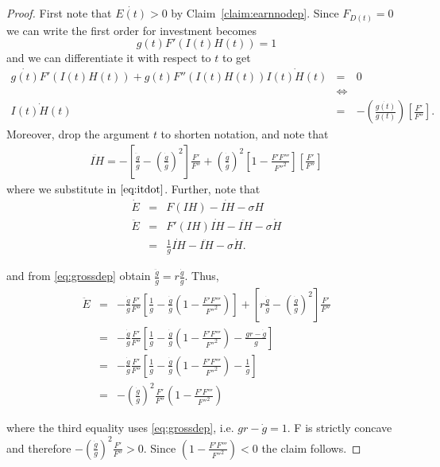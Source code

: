 \begin{proof}
First note that $\dot{E(t)} > 0$ by Claim~\ref{claim:earnnodep}. Since $F_{D(t)} = 0 $ we can write the first order for investment becomes
\begin{equation}
g(t) F'(I(t) H(t)) = 1
\end{equation}
and we can differentiate it with respect to $t$ to get
\begin{eqnarray}
\dot{g(t)} F'(I(t) H(t)) + g(t) F''(I(t) H(t)) \dot{I(t) H(t)} &=& 0 \nonumber \\
&\Leftrightarrow& \nonumber \\
\dot{I(t) H(t)} &=& - \left( \frac{\dot{g(t)}}{g(t)} \right) \left[ \frac{F'}{F''}\right] \label{eq:itdot}.
\end{eqnarray}
\noindent Moreover, drop the argument $t$ to shorten notation, and note that
\begin{eqnarray}
\ddot{IH} = - \left[ \frac{\ddot{g}}{g} - \left( \frac{\dot{g}}{g} \right)^2 \right] \frac{F'}{F''} + \left( \frac{\dot{g}}{g} \right)^2 \left[ 1 - \frac{F'F'''}{{F''}^2} \right] \left[ \frac{F'}{F''} \right]  
\end{eqnarray}  
where we substitute in $\eqref{eq:itdot}$. Further, note that
\begin{eqnarray}
\dot{E} &=& F(IH) - \dot{IH} - \sigma H \nonumber \\
\ddot{E} &=& F'(IH) \dot{IH} - \ddot{IH} - \sigma \dot{H} \nonumber \\
&=& \frac{1}{g} \dot{IH} - \ddot{IH} - \sigma \dot{H}.
\end{eqnarray}

\noindent and from \eqref{eq:grossdep} obtain $\frac{\ddot{g}}{g} = r \frac{\dot{g}}{g}$. Thus,
\begin{eqnarray}
\ddot{E} &=& - \frac{\dot{g}}{g} \frac{F'}{F''} \left[ \frac{1}{g} - \frac{\dot{g}}{g} \left( 1 - \frac{F'F'''}{{F''}^2} \right) \right] + \left[ r \frac{\dot{g}}{g} - \left( \frac{\dot{g}}{g} \right)^2 \right] \frac{F'}{F''} \nonumber \\
&=& - \frac{\dot{g}}{g} \frac{F'}{F''} \left[ \frac{1}{g} - \frac{\dot{g}}{g} \left( 1 - \frac{F'F'''}{{F''}^2} \right) - \frac{gr - \dot{g}}{g} \right] \nonumber \\
&=& - \frac{\dot{g}}{g} \frac{F'}{F''} \left[ \frac{1}{g} - \frac{\dot{g}}{g} \left( 1 - \frac{F'F'''}{{F''}^2} \right) - \frac{1}{g} \right] \nonumber \\
&=& - \left( \frac{\dot{g}}{g} \right)^2 \frac{F'}{F''} \left( 1 - \frac{F'F'''}{{F''}^2} \right)
\end{eqnarray}

\noindent where the third equality uses \eqref{eq:grossdep}, i.e. $gr - \dot{g} = 1$. F is strictly concave and therefore $-\left( \frac{\dot{g}}{g} \right)^2 \frac{F'}{F''} > 0$. Since $\left( 1 - \frac{F'F'''}{{F''}^2} \right) < 0$ the claim follows.
\end{proof}


